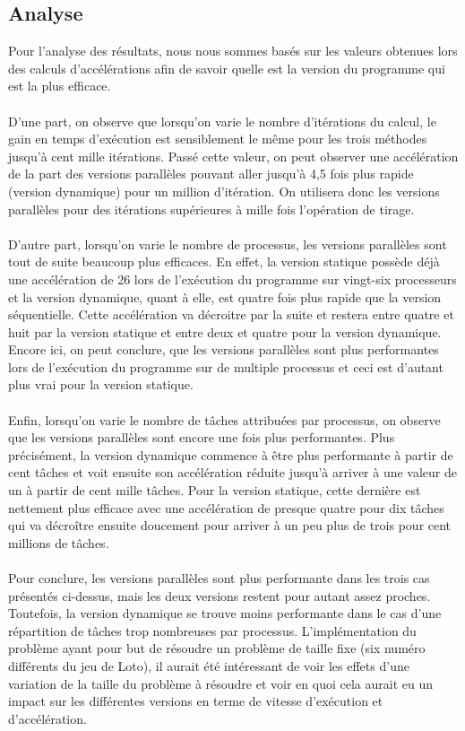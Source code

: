 \documentclass[a4paper,12pt]{article}
\begin{document}
\subsection{Analyse}
Pour l'analyse des résultats, nous nous sommes basés sur les valeurs obtenues lors des calculs d'accélérations afin de savoir quelle est la version du programme qui est la plus efficace. 
\\\\
\indent D'une part, on observe que lorsqu'on varie le nombre d'itérations du calcul, le gain en temps d'exécution est sensiblement le même pour les trois méthodes jusqu'à cent mille itérations. Passé cette valeur, on peut observer une accélération de la part des versions parallèles pouvant aller jusqu'à 4,5 fois plus rapide (version dynamique) pour un million d'itération. On utilisera donc les versions parallèles pour des itérations supérieures à mille fois l'opération de tirage. 
\\\\
\indent D'autre part, lorsqu'on varie le nombre de processus, les versions parallèles sont tout de suite beaucoup plus efficaces. En effet, la version statique possède déjà une accélération de 26 lors de l'exécution du programme sur vingt-six processeurs et la version dynamique, quant à elle, est quatre fois plus rapide que la version séquentielle. Cette accélération va décroitre par la suite et restera entre quatre et huit par la version statique et entre deux et quatre pour la version dynamique. Encore ici, on peut conclure, que les versions parallèles sont plus performantes lors de l'exécution du programme sur de multiple processus et ceci est d'autant plus vrai pour la version statique. 
\\\\
\indent Enfin, lorsqu'on varie le nombre de tâches attribuées par processus, on observe que les versions parallèles sont encore une fois plus performantes. Plus précisément, la version dynamique commence à être plus performante à partir de cent tâches et voit ensuite son accélération réduite jusqu'à arriver à une valeur de un à partir de cent mille tâches. Pour la version statique, cette dernière est nettement plus efficace avec une accélération de presque quatre pour dix tâches qui va décroître ensuite doucement pour arriver à un peu plus de trois pour cent millions de tâches.
\\\\
\indent Pour conclure, les versions parallèles sont plus performante dans les trois cas présentés ci-dessus, mais les deux versions restent pour autant assez proches. Toutefois, la version dynamique se trouve moins performante dans le cas d'une répartition de tâches trop nombreuses par processus. L'implémentation du problème ayant pour but de résoudre un problème de taille fixe (six numéro différents du jeu de Loto), il aurait été intéressant de voir les effets d'une variation de la taille du problème à résoudre et voir en quoi cela aurait eu un impact sur les différentes versions en terme de vitesse d'exécution et d'accélération. 


\newpage

\nocite{*} %


\end{document}
